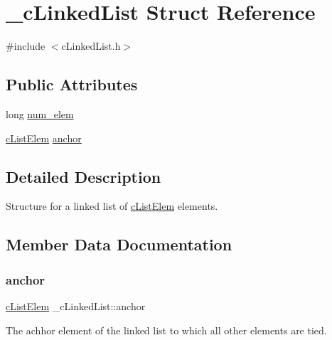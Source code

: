 \hypertarget{struct__c_linked_list}{}\section{\+\_\+c\+Linked\+List Struct Reference}
\label{struct__c_linked_list}


{\ttfamily \#include $<$c\+Linked\+List.\+h$>$}

\subsection*{Public Attributes}
\begin{DoxyCompactItemize}
\item 
long \mbox{\hyperlink{struct__c_linked_list_a0aeab3e3fe58a035b95efd647a90e99c}{num\+\_\+elem}}
\item 
\mbox{\hyperlink{c_linked_list_8h_ac8b72bb1eeaff60100466f6aa47be6b9}{c\+List\+Elem}} \mbox{\hyperlink{struct__c_linked_list_a61dacc83f3082db64830a20efd27e164}{anchor}}
\end{DoxyCompactItemize}


\subsection{Detailed Description}
Structure for a linked list of \mbox{\hyperlink{c_linked_list_8h_ac8b72bb1eeaff60100466f6aa47be6b9}{c\+List\+Elem}} elements. 

\subsection{Member Data Documentation}
\mbox{\label{struct__c_linked_list_a61dacc83f3082db64830a20efd27e164}} 
\subsubsection{\texorpdfstring{anchor}{anchor}}
{\footnotesize\ttfamily \mbox{\hyperlink{c_linked_list_8h_ac8b72bb1eeaff60100466f6aa47be6b9}{c\+List\+Elem}} \+\_\+c\+Linked\+List\+::anchor}

The achhor element of the linked list to which all other elements are tied. \mbox{\label{struct__c_linked_list_a0aeab3e3fe58a035b95efd647a90e99c}} 
